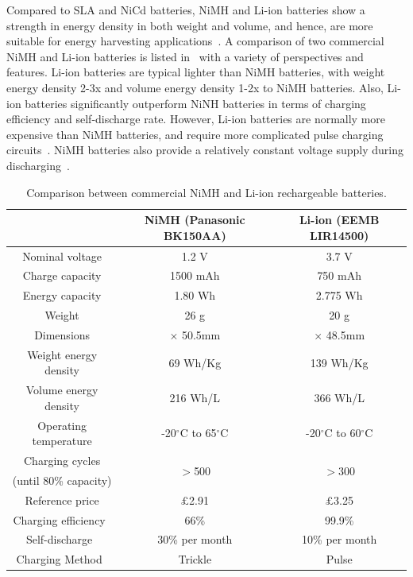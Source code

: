  Compared to SLA and NiCd batteries, NiMH and Li-ion batteries show a strength in energy density in both weight and volume, and hence, are more suitable for energy harvesting applications~\cite{raghunathan2005design, taneja2008design, akhtar2015energy, prauzek2018energy}. A comparison of two commercial NiMH and Li-ion batteries is listed in~ with a variety of perspectives and features. Li-ion batteries are typical lighter than NiMH batteries, with weight energy density 2-3x and volume energy density 1-2x to NiMH batteries. Also, Li-ion batteries significantly outperform NiNH batteries in terms of charging efficiency and self-discharge rate. However, Li-ion batteries are normally more expensive than NiMH batteries, and require more complicated pulse charging circuits~\cite{raghunathan2005design}. NiMH batteries also provide a relatively constant voltage supply during discharging~\cite{kansal2007power}. 

\begin{table}
    \renewcommand{\arraystretch}{1.2}
    \centering
    \begin{tabular}{|c|c|c|}
    \hline
     & NiMH (Panasonic BK150AA) & Li-ion (EEMB LIR14500) \\
    \hline
    Nominal voltage & 1.2 V & 3.7 V \\
    Charge capacity & 1500 mAh & 750 mAh \\
    Energy capacity & 1.80 Wh & 2.775 Wh \\
    Weight & 26 g & 20 g \\
    Dimensions & \diameter14.5mm $\times$ 50.5mm & \diameter14.1mm $\times$ 48.5mm \\
    Weight energy density & 69 Wh/Kg & 139 Wh/Kg \\
    Volume energy density & 216 Wh/L & 366 Wh/L \\
    Operating temperature & -20$^\circ$C to 65$^\circ$C & -20$^\circ$C to 60$^\circ$C \\
    Charging cycles & \multirow{2}{*}{$>$500} & \multirow{2}{*}{$>$300} \\
    (until 80\% capacity) & & \\
    Reference price & $\pounds$2.91 & $\pounds$3.25 \\
    Charging efficiency~\cite{prauzek2018energy} & 66\% & 99.9\% \\
    Self-discharge~\cite{prauzek2018energy} & 30\% per month & 10\% per month \\
    Charging Method~\cite{prauzek2018energy} & Trickle & Pulse \\
    \hline
    \end{tabular}
    \caption{Comparison between commercial NiMH and Li-ion rechargeable batteries.}
    \label{Table:nimhliion}
\end{table}

